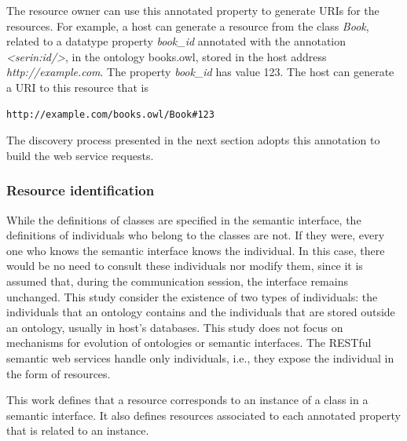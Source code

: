 \documentclass{singlecol-new}
\theoremstyle{TH}{
\newtheorem{lemma}{Lemma}
\newtheorem{theorem}[lemma]{Theorem}
\newtheorem{corrolary}[lemma]{Corrolary}
\newtheorem{conjecture}[lemma]{Conjecture}
\newtheorem{proposition}[lemma]{Proposition}
\newtheorem{claim}[lemma]{Claim}
\newtheorem{stheorem}[lemma]{Wrong Theorem}
\newtheorem{algorithm}{Algorithm}
}
\theoremstyle{THrm}{
\newtheorem{definition}{Definition}[section]
\newtheorem{question}{Question}[section]
\newtheorem{remark}{Remark}
\newtheorem{scheme}{Scheme}
}
\theoremstyle{THhit}{
\newtheorem{case}{Case}[section]
}
\begin{document}
The resource owner can use this annotated property to generate URIs for the resources. 
For example, a host can generate a resource from the class \textit{Book}, related to a datatype property \textit{book\_id} annotated with the annotation \textit{<serin:id/>}, in the ontology books.owl, stored in the host address \textit{http://example.com}. The property \textit{book\_id} has value 123. The host can generate a URI to this resource that is 

\begin{lstlisting}[breaklines=true]
http://example.com/books.owl/Book#123
\end{lstlisting}

The discovery process presented in the next section adopts this annotation to build the web service requests.

\subsubsection{Resource identification}
\label{sec:resourceid}

While the definitions of classes are specified in the semantic interface, the definitions of individuals who belong to the classes are not. 
If they were, every one who knows the semantic interface knows the individual. In this case, there would be no need to consult these individuals nor modify them, since it is assumed that, during the communication session, the interface remains unchanged. 
This study consider the existence of two types of individuals: the individuals that an ontology contains and the individuals that are stored outside an ontology, usually in host's databases.
This study does not focus on mechanisms for evolution of ontologies or semantic interfaces.
The RESTful semantic web services handle only individuals, i.e., they expose the individual in the form of resources.

This work defines that a resource corresponds to an instance of a class in a semantic interface. 
It also defines resources associated to each annotated property that is related to an instance.
\end{document}
